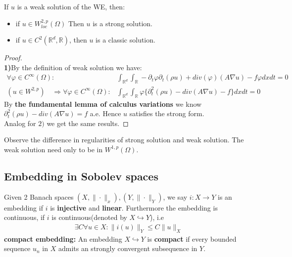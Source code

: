 \begin{theorem}
	If $u$ is a weak solution of the WE, then:
	\begin{itemize}
		\item if $u \in W^{2, p}_{loc}(\Omega)$  Then $u$ is a strong solution.
		\item if $u \in C^2(\mathbb{R}^d, \mathbb{R})$, then $u$ is a classic solution.
	\end{itemize} 
\end{theorem}
\begin{proof}\quad\\
\textbf{1)}By the definition of weak solution we have:
	\begin{align*}
		\forall \varphi \in C^\infty(\Omega):& \int_{\mathbb{R}^d} \int_\mathbb{R} - \partial_t \varphi \partial_t(\rho u) + div(\varphi)(A \nabla u) - f \varphi dx dt = 0\\
		(u \in W^{2, p}) \quad \Rightarrow \forall \varphi \in C^\infty(\Omega): & \int_{\mathbb{R}^d} \int_\mathbb{R} \varphi \{\partial^2_t (\rho u)   -  div(A \nabla u) -  f \}dxdt = 0
	\end{align*}
	By \textbf{the fundamental lemma of calculus variations} we know $\partial_t^2(\rho u) - div(A \nabla u) = f$ a.e. Hence $u$ satisfies the strong form. \\
	Analog for $2)$ we get the same results. 
\end{proof}
\begin{remark}
Observe the difference in regularities of strong solution and weak solution. The weak solution need only to be in $W^{1, p}(\Omega)$. 
\end{remark}


\subsection{Embedding in Sobolev spaces}
\begin{definition}[Embedding]
	Given 2 Banach spaces $(X, \|\cdot\|_x), (Y, \|\cdot\|_Y)$, we say $i: X \rightarrow Y$ is an embedding if $i$ is \textbf{injective} and \textbf{linear}. Furthermore the embedding is continuous, if $i$ is continuous(denoted by $X\hookrightarrow Y$), i.e 
	\begin{align*}
		\exists C \forall u \in X: \|i(u)\|_Y \leq C \|u\|_X
	\end{align*}
	\textbf{compact embedding: }
	An embedding $X \hookrightarrow Y$ is \textbf{compact} if every bounded sequence $u_n$ in $X$ admits an strongly convergent subsequence in $Y$. 
\end{definition}


